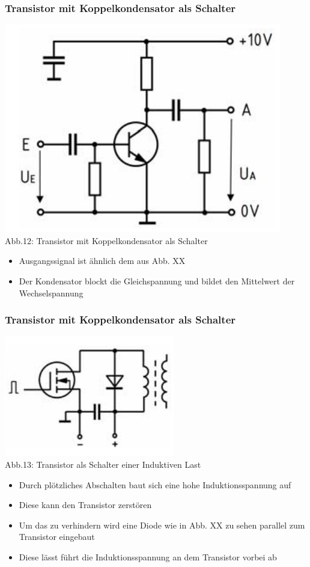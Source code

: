 \begin{frame}
	\frametitle{Transistor mit Koppelkondensator als Schalter}
	\begin{center}
			\includegraphics[scale=0.5]{a06/Transistor-Schalter+C.png}\\
			Abb.12: Transistor mit Koppelkondensator als Schalter \cite{bnetza}
		\end{center}
		\begin{itemize}
			\item	Ausgangssignal ist ähnlich dem aus Abb. XX
			\item	Der Kondensator blockt die Gleichspannung und bildet den Mittelwert der Wechselspannung
		\end{itemize}
\end{frame}

\begin{frame}
	\frametitle{Transistor mit Koppelkondensator als Schalter}
	\begin{center}
		\includegraphics[scale=0.5]{a06/Transistor-Schalter+L.png}\\
		Abb.13: Transistor als Schalter einer Induktiven Last \cite{bnetza}
	\end{center}
	\begin{itemize}
		\item	Durch plötzliches Abschalten baut sich eine hohe Induktionsspannung auf
		\item	Diese kann den Transistor zerstören
		\item	Um das zu verhindern wird eine Diode wie in Abb. XX zu sehen parallel zum Transistor eingebaut
		\item	Diese lässt führt die Induktionsspannung an dem Transistor vorbei ab
	\end{itemize}
\end{frame}


